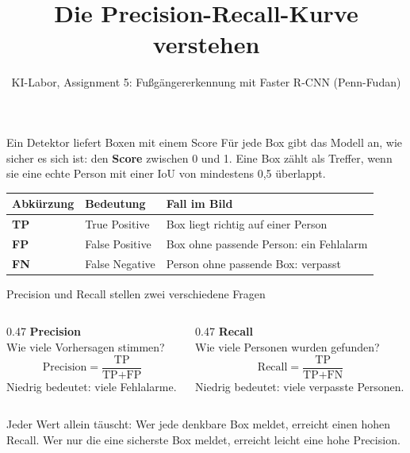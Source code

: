 \documentclass[aspectratio=169,11pt]{beamer}
\title{Die Precision-Recall-Kurve verstehen}
\subtitle{KI-Labor, Assignment 5: Fußgängererkennung mit Faster R-CNN (Penn-Fudan)}
\date{}
\newcommand{\hl}[1]{\textbf{#1}}
\begin{document}
\begin{frame}[plain]
  \titlepage
\end{frame}

\begin{frame}{Ein Detektor liefert Boxen mit einem Score}
  Für jede Box gibt das Modell an, wie sicher es sich ist: den \hl{Score} zwischen 0 und 1.
  Eine Box zählt als Treffer, wenn sie eine echte Person mit einer IoU von mindestens 0,5 überlappt.

  \vspace{5mm}
  \centering
  \renewcommand{\arraystretch}{1.35}
  \begin{tabular}{>{\bfseries}l l l}
    \toprule
    Abkürzung & Bedeutung & Fall im Bild \\
    \midrule
    {\color{gruen}TP} & True Positive & Box liegt richtig auf einer Person \\
    {\color{orange}FP} & False Positive & Box ohne passende Person: ein Fehlalarm \\
    {\color{blau}FN} & False Negative & Person ohne passende Box: verpasst \\
    \bottomrule
  \end{tabular}
\end{frame}

\begin{frame}{Precision und Recall stellen zwei verschiedene Fragen}
  \begin{columns}[T,onlytextwidth]
    \begin{column}{0.47\textwidth}
      \hl{Precision}\\[1mm]
      {\color{grautext}Wie viele Vorhersagen stimmen?}
      \[
        \text{Precision} = \frac{\text{TP}}{\text{TP} + \text{FP}}
      \]
      Niedrig bedeutet: viele Fehlalarme.
    \end{column}
    \begin{column}{0.47\textwidth}
      \hl{Recall}\\[1mm]
      {\color{grautext}Wie viele Personen wurden gefunden?}
      \[
        \text{Recall} = \frac{\text{TP}}{\text{TP} + \text{FN}}
      \]
      Niedrig bedeutet: viele verpasste Personen.
    \end{column}
  \end{columns}

  \vspace{7mm}
  Jeder Wert allein täuscht: Wer jede denkbare Box meldet, erreicht einen hohen Recall.
  Wer nur die eine sicherste Box meldet, erreicht leicht eine hohe Precision.
\end{frame}
\end{document}
